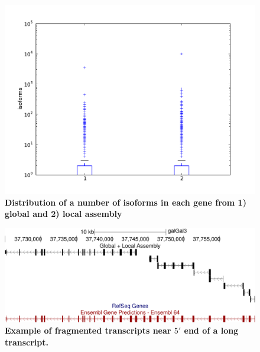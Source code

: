 \documentclass[10pt]{article}
\begin{document}
\begin{figure}[!ht]
\begin{center}
\includegraphics[width=5in]{isoforms_boxplot.pdf}
\end{center}
\caption{
{\bf Distribution of a number of isoforms in each gene from 1) global and 2) local assembly}
}
\label{isoforms_boxplot}
\end{figure}

\begin{figure}[!ht]
\begin{center}
\includegraphics[width=5in]{fragmented_transcripts.pdf}
\end{center}
\caption{
{\bf Example of fragmented transcripts near $5'$ end of a long transcript.}
}
\label{fragmented_transcripts}
\end{figure}
\end{document}
